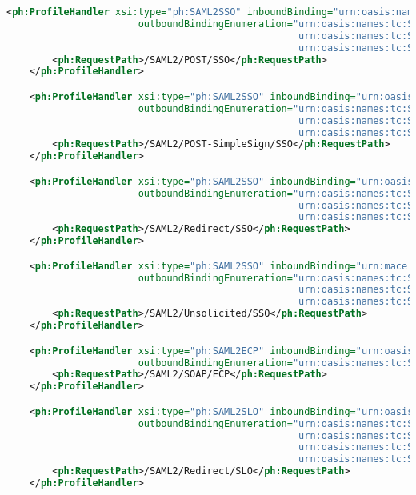 \begin{lstlisting}[language=xml]
    <ph:ProfileHandler xsi:type="ph:SAML2SSO" inboundBinding="urn:oasis:names:tc:SAML:2.0:bindings:HTTP-POST"
                       outboundBindingEnumeration="urn:oasis:names:tc:SAML:2.0:bindings:HTTP-POST-SimpleSign
                                                   urn:oasis:names:tc:SAML:2.0:bindings:HTTP-POST
                                                   urn:oasis:names:tc:SAML:2.0:bindings:HTTP-Artifact">
        <ph:RequestPath>/SAML2/POST/SSO</ph:RequestPath>
    </ph:ProfileHandler>

    <ph:ProfileHandler xsi:type="ph:SAML2SSO" inboundBinding="urn:oasis:names:tc:SAML:2.0:bindings:HTTP-POST-SimpleSign" 
                       outboundBindingEnumeration="urn:oasis:names:tc:SAML:2.0:bindings:HTTP-POST-SimpleSign
                                                   urn:oasis:names:tc:SAML:2.0:bindings:HTTP-POST
                                                   urn:oasis:names:tc:SAML:2.0:bindings:HTTP-Artifact">
        <ph:RequestPath>/SAML2/POST-SimpleSign/SSO</ph:RequestPath>
    </ph:ProfileHandler>

    <ph:ProfileHandler xsi:type="ph:SAML2SSO" inboundBinding="urn:oasis:names:tc:SAML:2.0:bindings:HTTP-Redirect"
                       outboundBindingEnumeration="urn:oasis:names:tc:SAML:2.0:bindings:HTTP-POST-SimpleSign
                                                   urn:oasis:names:tc:SAML:2.0:bindings:HTTP-POST
                                                   urn:oasis:names:tc:SAML:2.0:bindings:HTTP-Artifact">
        <ph:RequestPath>/SAML2/Redirect/SSO</ph:RequestPath>
    </ph:ProfileHandler>

    <ph:ProfileHandler xsi:type="ph:SAML2SSO" inboundBinding="urn:mace:shibboleth:2.0:profiles:AuthnRequest" 
                       outboundBindingEnumeration="urn:oasis:names:tc:SAML:2.0:bindings:HTTP-POST-SimpleSign
                                                   urn:oasis:names:tc:SAML:2.0:bindings:HTTP-POST
                                                   urn:oasis:names:tc:SAML:2.0:bindings:HTTP-Artifact">
        <ph:RequestPath>/SAML2/Unsolicited/SSO</ph:RequestPath>
    </ph:ProfileHandler>

    <ph:ProfileHandler xsi:type="ph:SAML2ECP" inboundBinding="urn:oasis:names:tc:SAML:2.0:bindings:SOAP" 
                       outboundBindingEnumeration="urn:oasis:names:tc:SAML:2.0:bindings:SOAP">
        <ph:RequestPath>/SAML2/SOAP/ECP</ph:RequestPath>
    </ph:ProfileHandler>

    <ph:ProfileHandler xsi:type="ph:SAML2SLO" inboundBinding="urn:oasis:names:tc:SAML:2.0:bindings:HTTP-Redirect"
                       outboundBindingEnumeration="urn:oasis:names:tc:SAML:2.0:bindings:HTTP-Redirect
                                                   urn:oasis:names:tc:SAML:2.0:bindings:HTTP-POST-SimpleSign
                                                   urn:oasis:names:tc:SAML:2.0:bindings:HTTP-POST
                                                   urn:oasis:names:tc:SAML:2.0:bindings:HTTP-Artifact">
        <ph:RequestPath>/SAML2/Redirect/SLO</ph:RequestPath>
    </ph:ProfileHandler>


\end{lstlisting}
